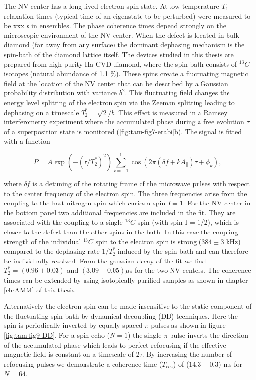 The NV center has a long-lived electron spin state. At low temperature $T_1$-relaxation times (typical time of an eigenstate to be perturbed) were measured to be xxx s in ensembles. The phase coherence times depend strongly on the microscopic environment of the NV center. When the defect is located in bulk diamond (far away from any surface) the dominant dephasing mechanism is the spin-bath of the diamond lattice itself. The devices studied in this thesis are prepared from high-purity IIa CVD diamond, where the spin bath consists of $^{13}C$ isotopes (natural abundance of 1.1 $\%$). These spins create a fluctuating magnetic field at the location of the NV center that can be described by a Gaussian probability distribution with variance $b^2$. This fluctuating field changes the energy level splitting of the electron spin via the Zeeman splitting leading to dephasing on a timescale $T_2^{*} = \sqrt{2}/b$. This effect is measured in a Ramsey interferometry experiment where the accumulated phase during a free evolution $\tau$ of a superposition state is monitored (\ref{fig:tam-fig7-erabi}b). The signal is fitted with a function

\begin{equation}\label{eq:tam-ramsey}
P = A \exp(-(\tau/T_2^*)^2)\sum\limits_{k=-1}^1 \cos(2 \pi(\delta f +k A_{\parallel})\tau +\phi_k),
\end{equation}

where $\delta f$ is a detuning of the rotating frame of the microwave pulses with respect to the center frequency of the electron spin. The three frequencies arise from the coupling to the host nitrogen spin which caries a spin $I = 1$. For the NV center in the bottom panel two additional frequencies are included in the fit. They are associated with the coupling to a single $^{13}C$ spin (with spin I = 1/2), which is closer to the defect than the other spins in the bath. In this case the coupling strength of the individual $^{13}C$ spin to the electron spin is strong ($384 \pm 3$ kHz) compared to the dephasing rate $1/T_2^*$ induced by the spin bath and can therefore be individually resolved. From the gaussian decay of the fit we find $T_2^{*} = (0.96 \pm 0.03)$ and $(3.09 \pm 0.05) \mu$s for the two NV centers. The coherence times can be extended by using isotopically purified samples as shown in chapter \ref{ch:AMM} of this thesis. 

Alternatively the electron spin can be made insensitive to the static component of the fluctuating spin bath by dynamical decoupling (DD) techniques. Here the spin is periodically inverted by equally spaced $\pi$ pulses as shown in figure \ref{fig:tam-fig9-DD}. For a spin echo ($N = 1$) the single $\pi$ pulse inverts the direction of the accumulated phase which leads to perfect refocusing if the effective magnetic field is constant on a timescale of 2$\tau$. By increasing the number of refocusing pulses we demonstrate a coherence time ($T_{coh}$) of ($14.3 \pm 0.3$) ms for $N = 64$.

